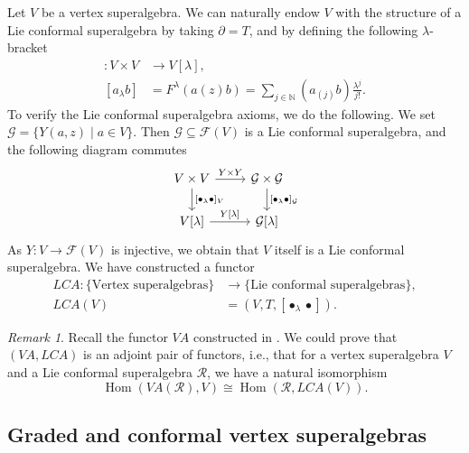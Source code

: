 \documentclass[a4paper, 12pt, reqno]{amsart}
\theoremstyle{remark}
\newtheorem{remark}[theorem]{Remark}
\DeclareMathOperator{\Hom}{Hom}
\begin{document}
Let $V$ be a vertex superalgebra.
We can naturally endow $V$ with the structure of a Lie conformal superalgebra by taking $\partial = T$, and by defining the following $\lambda$-bracket
\begin{align*}
  [\bullet_{\lambda}\bullet]: V \times V &\to V[\lambda], \\
  [a_{\lambda}b] &= F^{\lambda}(a(z)b) = \sum_{j \in \mathbb{N}}(a_{(j)}b)\frac{\lambda^j}{j!}.
\end{align*}
To verify the Lie conformal superalgebra axioms, we do the following.
We set $\mathcal{G} = \{Y(a, z) \mid a \in V\}$.
Then $\mathcal{G} \subseteq \mathcal{F}(V)$ is a Lie conformal superalgebra, and the following diagram commutes
\begin{equation*}
  \begin{tikzcd}
    V \times V \arrow[d, "{[\bullet_{\lambda}\bullet]_V}"] \arrow[r, "Y \times Y"] & \mathcal{G} \times \mathcal{G} \arrow[d, "{[\bullet_{\lambda}\bullet]_{\mathcal{G}}}"] \\
    {V[\lambda]} \arrow[r, "{Y[\lambda]}"] & {\mathcal{G}[\lambda]}
  \end{tikzcd}
\end{equation*}
As $Y: V \to \mathcal{F}(V)$ is injective, we obtain that $V$ itself is a Lie conformal superalgebra.
We have constructed a functor
\begin{align*}
  LCA: \{\text{Vertex superalgebras}\} &\to \{\text{Lie conformal superalgebras}\}, \\
  LCA(V) &= (V, T, [\bullet_{\lambda}\bullet]).
\end{align*}

\begin{remark}
  \label{rmk:16}
  Recall the functor $VA$ constructed in .
  We could prove that $(VA, LCA)$ is an adjoint pair of functors, i.e., that for a vertex superalgebra $V$ and a Lie conformal superalgebra $\mathcal{R}$, we have a natural isomorphism
  \begin{equation*}
    \Hom(VA(\mathcal{R}), V) \cong \Hom(\mathcal{R}, LCA(V)).
  \end{equation*}
\end{remark}

\subsection{Graded and conformal vertex superalgebras}
\label{sec:grad-conf-vert}
\end{document}
